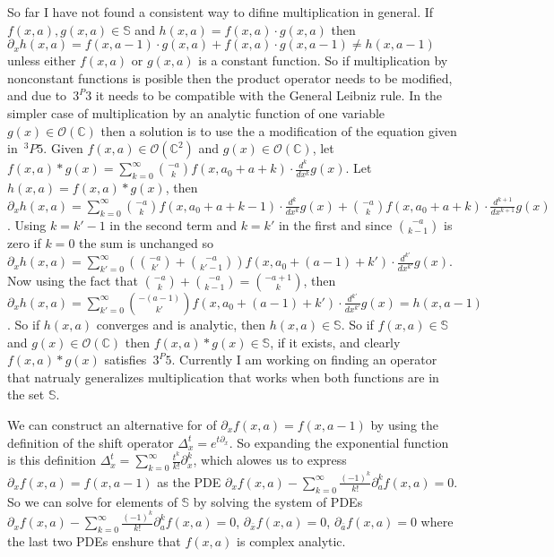 \documentclass[%
 onecolumn,
 amsmath, amssymb, aps, pra, 10pt
]{revtex4-2}
\begin{document}
So far I have not found a consistent way to difine multiplication in general. If $f(x, a), g(x, a) \in \mathbb{S}$ and $h(x, a) = f(x, a) \cdot g(x, a)$ then $\partial_x h(x, a) = f(x, a - 1) \cdot g(x, a) + f(x, a) \cdot g(x, a - 1) \neq h(x, a - 1)$ unless either $f(x, a)$ or $g(x, a)$ is a constant function. So if multiplication by nonconstant functions is posible then the product operator needs to be modified, and due to $\,3^P3$ it needs to be compatible with the General Leibniz rule. In the simpler case of multiplication by an analytic function of one variable $g(x) \in \mathcal{O}(\mathbb{C})$ then a solution is to use the a modification of the equation given in $\,^3P5$. Given $f(x, a) \in \mathcal{O}(\mathbb{C}^2)$ and $g(x) \in \mathcal{O}(\mathbb{C})$, let $f(x, a) * g(x) = \sum_{k=0}^{\infty} \binom{-a}{k}f(x, a_0 + a + k) \cdot \frac{d^k}{dx^k} g(x)$. Let $h(x, a) = f(x, a) * g(x)$, then $\partial_x h(x, a) = \sum_{k=0}^{\infty} \binom{-a}{k}f(x, a_0 + a + k - 1) \cdot \frac{d^k}{dx^k} g(x) + \binom{-a}{k}f(x, a_0 + a + k) \cdot \frac{d^{k + 1}}{dx^{k + 1}} g(x)$. Using $k = k' - 1$ in the second term and $k = k'$ in the first and since $\binom{-a}{k-1}$ is zero if $k=0$ the sum is unchanged so $\partial_x h(x, a) = \sum_{k'=0}^{\infty} \left( \binom{-a}{k'} + \binom{-a}{k' - 1} \right)f(x, a_0 + (a - 1) + k') \cdot \frac{d^{k'}}{dx^{k'}} g(x)$. Now using the fact that $\binom{-a}{k} + \binom{-a}{k - 1} = \binom{-a + 1}{k}$, then $\partial_x h(x, a) = \sum_{k'=0}^{\infty} \binom{-(a - 1)}{k'}f(x, a_0 + (a - 1) + k') \cdot \frac{d^{k'}}{dx^{k'}} g(x) = h(x, a - 1)$. So if $h(x, a)$ converges and is analytic, then $h(x, a) \in \mathbb{S}$. So if $f(x, a) \in \mathbb{S}$ and $g(x) \in \mathcal{O}(\mathbb{C})$ then $f(x, a) * g(x) \in \mathbb{S}$, if it exists, and clearly $f(x, a) * g(x)$ satisfies $\,3^P5$. Currently I am working on finding an operator that natrualy generalizes multiplication that works when both functions are in the set $\mathbb{S}$.

We can construct an alternative for of $\partial_x f(x, a) = f(x, a - 1)$ by using the definition of the shift operator $\Delta_{x}^{t} = e^{t \partial_x}$. So expanding the exponential function is this definition $\Delta_{x}^t = \sum_{k=0}^{\infty} \frac{t^k}{k!} \partial_{x}^{k}$, which alowes us to express $\partial_x f(x, a) = f(x, a - 1)$ as the PDE $\partial_x f(x, a) - \sum_{k=0}^{\infty} \frac{(-1)^k}{k!}\partial_{a}^{k} f(x, a) = 0$. So we can solve for elements of $\mathbb{S}$ by solving the system of PDEs $\partial_x f(x, a) - \sum_{k=0}^{\infty} \frac{(-1)^k}{k!} \partial_{a}^{k} f(x, a) = 0$, $\partial_{\bar{x}} f(x, a) = 0$, $\partial_{\bar{a}} f(x, a) = 0$ where the last two PDEs enshure that $f(x, a)$ is complex analytic.
\end{document}
